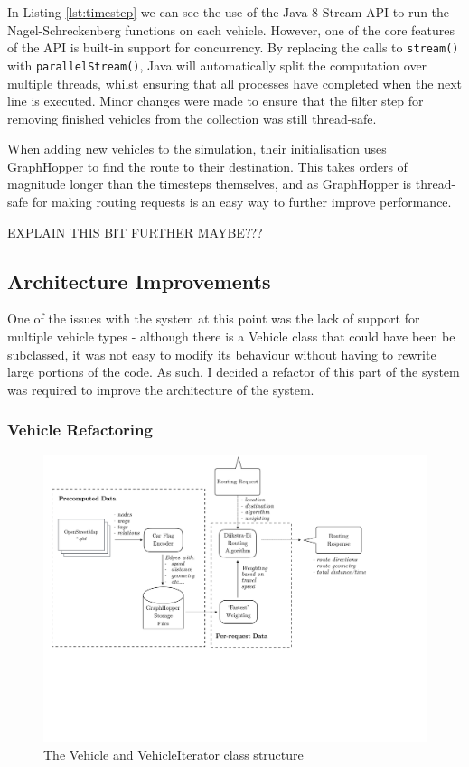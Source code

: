 \documentclass[ %
                    author={Alexander Hill},
                supervisor={Dr. Benjamin Sach},
                    degree={MEng},
                     title={MARMOSET},
                  subtitle={Multi-Agent Route Management using Online Simulation for Efficient Transportation},
                      type={research},
                      year={2016} ]{dissertation}
\begin{document}
In Listing \ref{lst:timestep} we can see the use of the Java 8 Stream API to run
the Nagel-Schreckenberg functions on each vehicle. However, one of the core
features of the API is built-in support for concurrency. By replacing the calls
to \texttt{stream()} with \texttt{parallelStream()}, Java will automatically
split the computation over multiple threads, whilst ensuring that all processes
have completed when the next line is executed. Minor changes were made to ensure
that the filter step for removing finished vehicles from the collection was
still thread-safe.

When adding new vehicles to the simulation, their initialisation uses
GraphHopper to find the route to their destination. This takes orders of
magnitude longer than the timesteps themselves, and as GraphHopper is
thread-safe for making routing requests is an easy way to further improve
performance.

EXPLAIN THIS BIT FURTHER MAYBE???

\subsection{Architecture Improvements}

One of the issues with the system at this point was the lack of support for
multiple vehicle types - although there is a Vehicle class that could have been
be subclassed, it was not easy to modify its behaviour without having to rewrite
large portions of the code.  As such, I decided a refactor of this part of the
system was required to improve the architecture of the system.

\subsubsection{Vehicle Refactoring}

\begin{figure}[h]
    \centering
    \includegraphics[scale=0.6,page=6,clip,trim=0 11cm 8cm 0]{architecture}
    \caption{The Vehicle and VehicleIterator class structure}\label{fig:veh-arch}
\end{figure}
\end{document}
